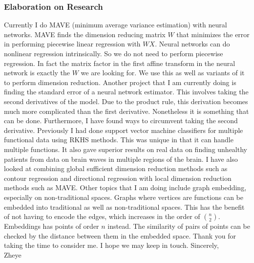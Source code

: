 \documentclass[utf8,letterpaper,oneside]{article}
\begin{document}
\subsubsection*{Elaboration on Research}
Currently I do MAVE (minimum average variance estimation) with neural networks. MAVE finds the dimension reducing matrix $W$ that minimizes the error in performing piecewise linear regression with $WX$. Neural networks can do nonlinear regression intrinsically. So we do not need to perform piecewise regression. In fact the matrix factor in the first affine transform in the neural network is exactly the $W$ we are looking for. We use this as well as variants of it to perform dimension reduction. Another project that I am currently doing is finding the standard error of a neural network estimator. This involves taking the second derivatives of the model. Due to the product rule, this derivation becomes much more complicated than the first derivative. Nonetheless it is something that can be done. Furthermore, I have found ways to circumvent taking the second derivative. Previously I had done support vector machine classifiers for multiple functional data using RKHS methods. This was unique in that it can handle multiple functions. It also gave superior results on real data on finding unhealthy patients from data on brain waves in multiple regions of the brain. I have also looked at combining global sufficient dimension reduction methods such as contour regression and directional regression with local dimension reduction methods such as MAVE. Other topics that I am doing include graph embedding, especially on non-traditional spaces. Graphs where vertices are functions can be embedded into traditional as well as non-traditional spaces. This has the benefit of not having to encode the edges, which increases in the order of $n \choose 2$. Embeddings has points of order $n$ instead. The similarity of pairs of points can be checked by the distance between them in the embedded space.
\vskip 1cm
Thank you for taking the time to consider me. I hope we may keep in touch.
\vskip 1cm
Sincerely,\\
Zheye
\end{document}
